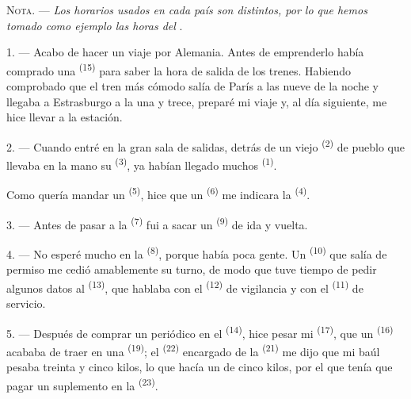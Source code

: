 
\VUsaut{4.0mm}
\VUsaut{2.4mm}
\VUsaut{3.4mm}
\textsc{Nota.} --- \textit{Los horarios usados en cada país son distintos,
por lo que hemos tomado como ejemplo las horas del} .

1. --- Acabo de hacer un viaje por Alemania. Antes de emprenderlo había
comprado una  \textsuperscript{(15)} para saber la hora de
salida de los trenes. Habiendo comprobado que el tren más cómodo salía de
París a las nueve de la noche y llegaba a Estrasburgo a la una y trece,
preparé mi viaje y, al día siguiente, me hice llevar a la estación.

2. --- Cuando entré en la gran sala de salidas, detrás de un viejo
 \textsuperscript{(2)} de pueblo que llevaba en la mano su  \textsuperscript{(3)}, ya habían llegado muchos 
\textsuperscript{(1)}.

Como quería mandar un  \textsuperscript{(5)}, hice que un
 \textsuperscript{(6)} me indicara la 
\textsuperscript{(4)}.

3. --- Antes de pasar a la  \textsuperscript{(7)} fui a sacar
un  \textsuperscript{(9)} de ida y vuelta.

4. --- No esperé mucho en la  \textsuperscript{(8)}, porque había
poca gente. Un  \textsuperscript{(10)} que salía de permiso me cedió
amablemente su turno, de modo que tuve tiempo de pedir algunos datos al
 \textsuperscript{(13)}, que hablaba con el 
\textsuperscript{(12)} de vigilancia y con el  \textsuperscript{(11)} de
servicio.

\VUsaut{3.0mm}

5. --- Después de comprar un periódico en el 
\textsuperscript{(14)}, hice pesar mi  \textsuperscript{(17)}, que un
 \textsuperscript{(16)} acababa de traer en una 
\textsuperscript{(19)}; el  \textsuperscript{(22)} encargado de la
 \textsuperscript{(21)} me dijo que mi baúl pesaba treinta y cinco
kilos, lo que hacía un  de cinco kilos, por el que tenía que
pagar un suplemento en la  \textsuperscript{(23)}.

